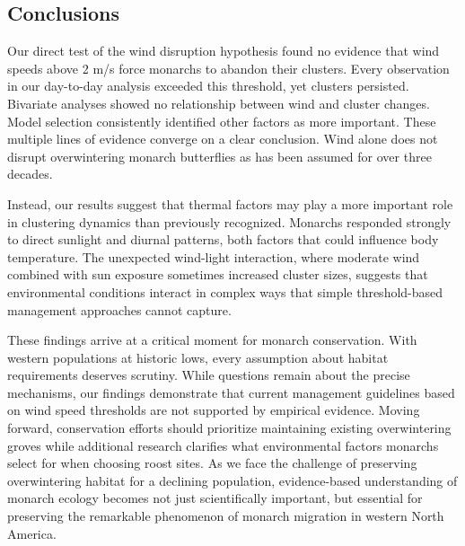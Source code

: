 \subsection{Conclusions}

Our direct test of the wind disruption hypothesis found no evidence that wind speeds above 2 m/s force monarchs to abandon their clusters. Every observation in our day-to-day analysis exceeded this threshold, yet clusters persisted. Bivariate analyses showed no relationship between wind and cluster changes. Model selection consistently identified other factors as more important. These multiple lines of evidence converge on a clear conclusion. Wind alone does not disrupt overwintering monarch butterflies as has been assumed for over three decades.

Instead, our results suggest that thermal factors may play a more important role in clustering dynamics than previously recognized. Monarchs responded strongly to direct sunlight and diurnal patterns, both factors that could influence body temperature. The unexpected wind-light interaction, where moderate wind combined with sun exposure sometimes increased cluster sizes, suggests that environmental conditions interact in complex ways that simple threshold-based management approaches cannot capture.

These findings arrive at a critical moment for monarch conservation. With western populations at historic lows, every assumption about habitat requirements deserves scrutiny. While questions remain about the precise mechanisms, our findings demonstrate that current management guidelines based on wind speed thresholds are not supported by empirical evidence. Moving forward, conservation efforts should prioritize maintaining existing overwintering groves while additional research clarifies what environmental factors monarchs select for when choosing roost sites. As we face the challenge of preserving overwintering habitat for a declining population, evidence-based understanding of monarch ecology becomes not just scientifically important, but essential for preserving the remarkable phenomenon of monarch migration in western North America.